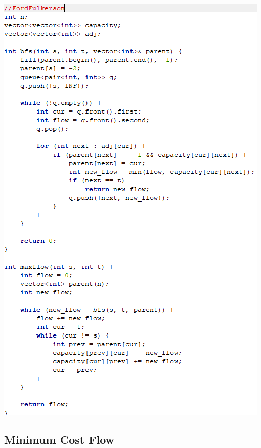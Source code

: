 \documentclass[11pt,twocolumn]{article}
\begin{document}
\includegraphics[scale=0.6]{fordfulkerson}

\subsection{Minimum Cost Flow}
\end{document}
